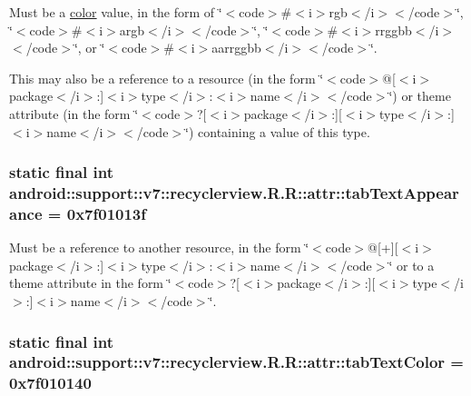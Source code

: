 Must be a \hyperlink{classandroid_1_1support_1_1v7_1_1recyclerview_1_1_r_1_1color}{color} value, in the form of \char`\"{}$<$code$>$\#$<$i$>$rgb$<$/i$>$$<$/code$>$\char`\"{}, \char`\"{}$<$code$>$\#$<$i$>$argb$<$/i$>$$<$/code$>$\char`\"{}, \char`\"{}$<$code$>$\#$<$i$>$rrggbb$<$/i$>$$<$/code$>$\char`\"{}, or \char`\"{}$<$code$>$\#$<$i$>$aarrggbb$<$/i$>$$<$/code$>$\char`\"{}. 

This may also be a reference to a resource (in the form \char`\"{}$<$code$>$@\mbox{[}$<$i$>$package$<$/i$>$:\mbox{]}$<$i$>$type$<$/i$>$:$<$i$>$name$<$/i$>$$<$/code$>$\char`\"{}) or theme attribute (in the form \char`\"{}$<$code$>$?\mbox{[}$<$i$>$package$<$/i$>$:\mbox{]}\mbox{[}$<$i$>$type$<$/i$>$:\mbox{]}$<$i$>$name$<$/i$>$$<$/code$>$\char`\"{}) containing a value of this type. \hypertarget{classandroid_1_1support_1_1v7_1_1recyclerview_1_1_r_1_1attr_6e8fb1a4964d3b201dd58e4e58b8ace6}{
\subsubsection[{tabTextAppearance}]{\setlength{\rightskip}{0pt plus 5cm}static final int android::support::v7::recyclerview.R.R::attr::tabTextAppearance = 0x7f01013f}}
\label{classandroid_1_1support_1_1v7_1_1recyclerview_1_1_r_1_1attr_6e8fb1a4964d3b201dd58e4e58b8ace6}


Must be a reference to another resource, in the form \char`\"{}$<$code$>$@\mbox{[}+\mbox{]}\mbox{[}$<$i$>$package$<$/i$>$:\mbox{]}$<$i$>$type$<$/i$>$:$<$i$>$name$<$/i$>$$<$/code$>$\char`\"{} or to a theme attribute in the form \char`\"{}$<$code$>$?\mbox{[}$<$i$>$package$<$/i$>$:\mbox{]}\mbox{[}$<$i$>$type$<$/i$>$:\mbox{]}$<$i$>$name$<$/i$>$$<$/code$>$\char`\"{}. \hypertarget{classandroid_1_1support_1_1v7_1_1recyclerview_1_1_r_1_1attr_55d0c12b42669cd36cab4557d8307494}{
\subsubsection[{tabTextColor}]{\setlength{\rightskip}{0pt plus 5cm}static final int android::support::v7::recyclerview.R.R::attr::tabTextColor = 0x7f010140}}
\label{classandroid_1_1support_1_1v7_1_1recyclerview_1_1_r_1_1attr_55d0c12b42669cd36cab4557d8307494}


